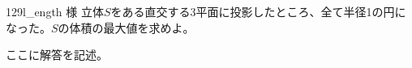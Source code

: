 \begin{thm}{129}{}{l\_ength 様}
 立体$S$をある直交する3平面に投影したところ、全て半径1の円になった。$S$の体積の最大値を求めよ。
\end{thm}

ここに解答を記述。